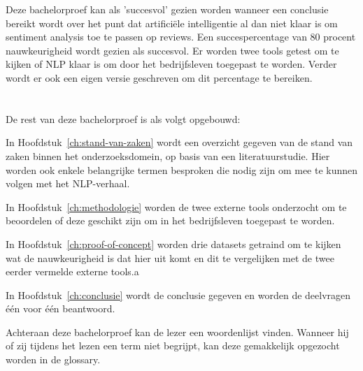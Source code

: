 Deze bachelorproef kan als 'succesvol' gezien worden wanneer een conclusie bereikt wordt over het punt dat artificiële intelligentie al dan niet klaar is om sentiment analysis toe te passen op reviews. Een succespercentage van 80 procent nauwkeurigheid wordt gezien als succesvol. Er worden twee tools getest om te kijken of NLP klaar is om door het bedrijfsleven toegepast te worden. Verder wordt er ook een eigen versie geschreven om dit percentage te bereiken.

\section{}
\label{sec:opzet-bachelorproef}


De rest van deze bachelorproef is als volgt opgebouwd:

In Hoofdstuk~\ref{ch:stand-van-zaken} wordt een overzicht gegeven van de stand van zaken binnen het onderzoeksdomein, op basis van een literatuurstudie. Hier worden ook enkele belangrijke termen besproken die nodig zijn om mee te kunnen volgen met het NLP-verhaal.

In Hoofdstuk~\ref{ch:methodologie} worden de twee externe tools onderzocht om te beoordelen of deze geschikt zijn om in het bedrijfsleven toegepast te worden.

In Hoofdstuk~\ref{ch:proof-of-concept} worden drie datasets getraind om te kijken wat de nauwkeurigheid is dat hier uit komt en dit te vergelijken met de twee eerder vermelde externe tools.a

In Hoofdstuk~\ref{ch:conclusie} wordt de conclusie gegeven en worden de deelvragen één voor één beantwoord. 

Achteraan deze bachelorproef kan de lezer een woordenlijst vinden. Wanneer hij of zij tijdens het lezen een term niet begrijpt, kan deze gemakkelijk opgezocht worden in de glossary.